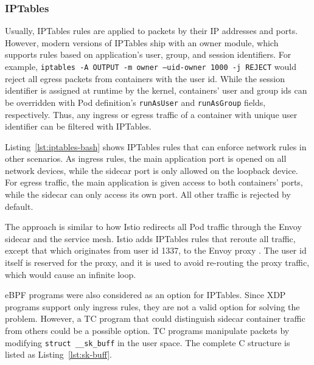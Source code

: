 \documentclass[english, 12pt, a4paper, sci, utf8, a-2b, online]{aaltothesis}
\begin{document}
\subsubsection{IPTables}

Usually, IPTables rules are applied to packets by their IP addresses and ports. However, modern versions of IPTables ship with an owner module, which supports rules based on application's user, group, and session identifiers. For example, \texttt{iptables -A OUTPUT -m owner --uid-owner 1000 -j REJECT} would reject all egress packets from containers with the user id. While the session identifier is assigned at runtime by the kernel, containers' user and group ids can be overridden with Pod definition's \texttt{runAsUser} and \texttt{runAsGroup} fields, respectively. Thus, any ingress or egress traffic of a container with unique user identifier can be filtered with IPTables.

Listing~\ref{lst:iptables-bash} shows IPTables rules that can enforce network rules in other scenarios. As ingress rules, the main application port is opened on all network devices, while the sidecar port is only allowed on the loopback device. For egress traffic, the main application is given access to both containers' ports, while the sidecar can only access its own port. All other traffic is rejected by default.




The approach is similar to how Istio redirects all Pod traffic through the Envoy sidecar and the service mesh. Istio adds IPTables rules that reroute all traffic, except that which originates from user id 1337, to the Envoy proxy \cite{istio-iptables}. The user id itself is reserved for the proxy, and it is used to avoid re-routing the proxy traffic, which would cause an infinite loop.

eBPF programs were also considered as an option for IPTables. Since XDP programs support only ingress rules, they are not a valid option for solving the problem. However, a TC program that could distinguish sidecar container traffic from others could be a possible option. TC programs manipulate packets by modifying \texttt{struct \_\_sk\_buff} in the user space. The complete C structure is listed as Listing~\ref{lst:sk-buff}.
\end{document}
